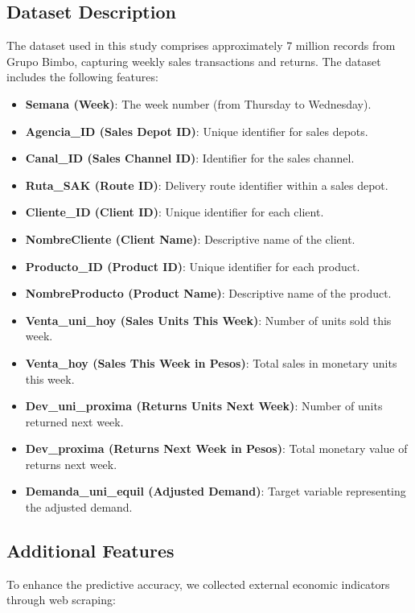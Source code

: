 \documentclass[letterpaper, 10 pt, conference]{ieeeconf}  %
\begin{document}
\subsection{Dataset Description}
The dataset used in this study comprises approximately 7 million records from Grupo Bimbo, capturing weekly sales transactions and returns. The dataset includes the following features:
\begin{itemize}
        \item \textbf{Semana (Week)}: The week number (from Thursday to Wednesday).
        \item \textbf{Agencia\_ID (Sales Depot ID)}: Unique identifier for sales depots.
        \item \textbf{Canal\_ID (Sales Channel ID)}: Identifier for the sales channel.
        \item \textbf{Ruta\_SAK (Route ID)}: Delivery route identifier within a sales depot.
        \item \textbf{Cliente\_ID (Client ID)}: Unique identifier for each client.
        \item \textbf{NombreCliente (Client Name)}: Descriptive name of the client.
        \item \textbf{Producto\_ID (Product ID)}: Unique identifier for each product.
        \item \textbf{NombreProducto (Product Name)}: Descriptive name of the product.
        \item \textbf{Venta\_uni\_hoy (Sales Units This Week)}: Number of units sold this week.
        \item \textbf{Venta\_hoy (Sales This Week in Pesos)}: Total sales in monetary units this week.
        \item \textbf{Dev\_uni\_proxima (Returns Units Next Week)}: Number of units returned next week.
        \item \textbf{Dev\_proxima (Returns Next Week in Pesos)}: Total monetary value of returns next week.
        \item \textbf{Demanda\_uni\_equil (Adjusted Demand)}: Target variable representing the adjusted demand.
\end{itemize}

\subsection{Additional Features}
To enhance the predictive accuracy, we collected external economic indicators through web scraping:
\end{document}

